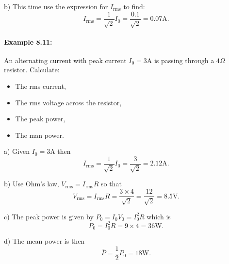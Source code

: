 b) This time use the expression for $I_{\text{rms}}$ to find:
\begin{equation*}
I_{\text{rms}}=\frac{1}{\sqrt{2}}I_{0}=\frac{0.1}{\sqrt{2}}=0.07\text{A}.
\end{equation*}

\paragraph{Example 8.11:} An alternating current with peak current $I_{0}=3\text{A}$ is passing through a $4\Omega$ resistor. Calculate:
\begin{itemize}
\setlength{\itemsep}{-5pt}
    \item[a)] The rms current,
    \item[b)] The rms voltage across the resistor,
    \item[c)] The peak power,
    \item[d)] The man power.
\end{itemize}  

a) Given $I_{0}=3\text{A}$ then
\begin{equation*}
I_{\text{rms}}=\frac{1}{\sqrt{2}}I_{0}=\frac{3}{\sqrt{2}}=2.12\text{A}.
\end{equation*}

b) Use Ohm's law, $V_{\text{rms}}=I_{\text{rms}}R$ so that
\begin{equation*}
V_{\text{rms}}=I_{\text{rms}}R=\frac{3\times 4}{\sqrt{2}}=\frac{12}{\sqrt{2}}=8.5\text{V}.
\end{equation*}

c) The peak power is given  by $P_{0}=I_{0}V_{0}=I_{0}^{2}R$ which is
\begin{equation*}
P_{0}=I_{0}^{2}R=9\times 4=36\text{W}.
\end{equation*}

d) The mean power is then
\begin{equation*}
\bar{P}=\frac{1}{2}P_{0}=18\text{W}.
\end{equation*}

\newpage
